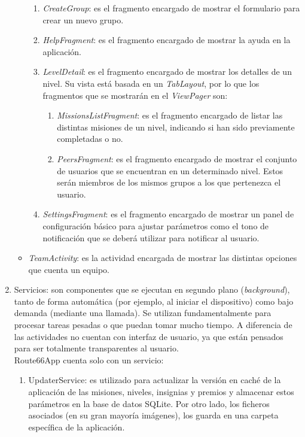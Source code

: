 \documentclass[twoside]{report}
\begin{document}
\begin{enumerate}
\begin{itemize}
	\begin{enumerate}
		\item \textit{CreateGroup}: es el fragmento encargado de mostrar el formulario para crear un nuevo grupo.
		\item \textit{HelpFragment}: es el fragmento encargado de mostrar la ayuda en la aplicación.
		\item \textit{LevelDetail}: es el fragmento encargado de mostrar los detalles de un nivel. Su vista está basada en un \textit{TabLayout}, por lo que los fragmentos que se mostrarán en el \textit{ViewPager} son:
		\begin{enumerate}
		\item \textit{MissionsListFragment}: es el fragmento encargado de listar las distintas misiones de un nivel, indicando si han sido previamente completadas o no.
		\item \textit{PeersFragment}: es el fragmento encargado de mostrar el conjunto de usuarios que se encuentran en un determinado nivel. Estos serán miembros de los mismos grupos a los que pertenezca el usuario.
		\end{enumerate}
		\item \textit{SettingsFragment}: es el fragmento encargado de mostrar un panel de configuración básico para ajustar parámetros como el tono de notificación que se deberá utilizar para notificar al usuario.
	\end{enumerate}
	\item \textit{TeamActivity}: es la actividad encargada de mostrar las distintas opciones que cuenta un equipo.
	\end{itemize}

\item Servicios: son componentes que se ejecutan en segundo plano (\textit{background}), tanto de forma automática (por ejemplo, al iniciar el dispositivo) como bajo demanda (mediante una llamada). Se utilizan fundamentalmente para procesar tareas pesadas o que puedan tomar mucho tiempo. A diferencia de las actividades no cuentan con interfaz de usuario, ya que están pensados para ser totalmente transparentes al usuario.\\
Route66App cuenta solo con un servicio:
	\begin{enumerate}
	\item UpdaterService: es utilizado para actualizar la versión en caché de la aplicación de las misiones, niveles, insignias y premios y almacenar estos parámetros en la base de datos SQLite. Por otro lado, los ficheros asociados (en su gran mayoría imágenes), los guarda en una carpeta específica de la aplicación.
	\end{enumerate}


\end{enumerate}
\end{document}
